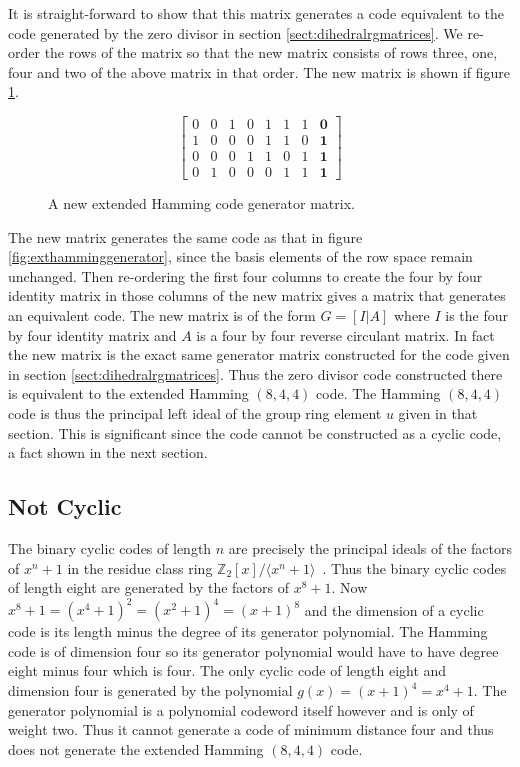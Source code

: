 It is straight-forward to show that this matrix generates a code equivalent to the code generated by the zero divisor in section \ref{sect:dihedralrgmatrices}.
We re-order the rows of the matrix so that the new matrix consists of rows three, one, four and two of the above matrix in that order.
The new matrix is shown if figure \ref{fig:newexthamminggen}.
\begin{figure}[htbp]
\begin{center}
\[ \left[ \begin{array}{cccccccc}
0 & 0 & 1 & 0 & 1 & 1 & 1 & \textbf{0} \\
1 & 0 & 0 & 0 & 1 & 1 & 0 & \textbf{1} \\
0 & 0 & 0 & 1 & 1 & 0 & 1 & \textbf{1} \\
0 & 1 & 0 & 0 & 0 & 1 & 1 & \textbf{1}
\end{array} \right] \]
\caption{A new extended Hamming code generator matrix.}
\label{fig:newexthamminggen}
\end{center}
\end{figure}
The new matrix generates the same code as that in figure \ref{fig:exthamminggenerator}, since the basis elements of the row space remain unchanged.
Then re-ordering the first four columns to create the four by four identity matrix in those columns of the new matrix gives a matrix that generates an equivalent code.
The new matrix is of the form $G=[I|A]$ where $I$ is the four by four identity matrix and $A$ is a four by four reverse circulant matrix.
In fact the new matrix is the exact same generator matrix constructed for the code given in section \ref{sect:dihedralrgmatrices}.
Thus the zero divisor code constructed there is equivalent to the extended Hamming $(8,4,4)$ code.
The Hamming $(8,4,4)$ code is thus the principal left ideal of the group ring element $u$ given in that section.
This is significant since the code cannot be constructed as a cyclic code, a fact shown in the next section.

\subsection{Not Cyclic}
\label{sect:notcyclic}
The binary cyclic codes of length $n$ are precisely the principal ideals of the factors of $x^n+1$ in the residue class ring $\mathbb{Z}_2[x]/ \langle x^n+1 \rangle$~\cite[p.~101]{bla04}.
Thus the binary cyclic codes of length eight are generated by the factors of $x^8+1$.
Now $x^8+1 = (x^4+1)^2 = (x^2+1)^4 = (x+1)^8$ and the dimension of a cyclic code is its length minus the degree of its generator polynomial.
The Hamming code is of dimension four so its generator polynomial would have to have degree eight minus four which is four.
The only cyclic code of length eight and dimension four is generated by the polynomial $g(x)=(x+1)^4=x^4+1$.
The generator polynomial is a polynomial codeword itself however and is only of weight two.
Thus it cannot generate a code of minimum distance four and thus does not generate the extended Hamming $(8,4,4)$ code.

